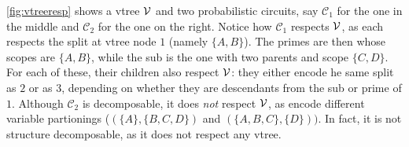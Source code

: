 \cref{fig:vtreeresp} shows a vtree $\operatorname{\mathcal{V}}$ and two probabilistic circuits, say
$\mathcal{C}_1$ for the one in the middle and $\mathcal{C}_2$ for the one on the right. Notice how
$\mathcal{C}_1$ respects $\operatorname{\mathcal{V}}$, as each \inode[fill=boxred!70]{\newProdNode} respects the split
at vtree node $1$ (namely $\{A,B\}$). The primes are then \inode[fill=boxpurple!60]{\newSumNode}
whose scopes are $\{A,B\}$, while the sub is the one with two parents and scope $\{C,D\}$. For each
of these, their children \inode[fill=boxbrown!60]{\newProdNode} also respect $\operatorname{\mathcal{V}}$: they either
encode he same split as $2$ or as $3$, depending on whether they are descendants from the sub or
prime of $1$. Although $\mathcal{C}_2$ is decomposable, it does \emph{not} respect $\operatorname{\mathcal{V}}$, as
\inode[fill=boxred!70]{\newProdNode} encode different variable partionings ($(\{A\},\{B,C,D\})$ and
$(\{A,B,C\},\{D\}))$. In fact, it is not structure decomposable, as it does not respect any vtree.


